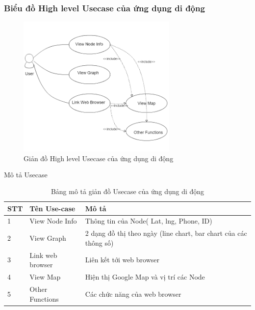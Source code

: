 \subsubsection*{Biểu đồ High level Usecase của ứng dụng di động}

\begin{figure}[H]
\centering    
\includegraphics[width=0.7\textwidth]{app_usecase}
\caption[Giản đồ High level Usecase của ứng dụng di động]{Giản đồ High level Usecase của ứng dụng di động}
\label{fig:app_usecase}
\end{figure}

Mô tả Usecase

\begin{table}[H]
\centering
\caption{Bảng mô tả giản đồ Usecase của ứng dụng di động}
\label{table:usecase_mobile}
\begin{tabular}{|l|l|l|}
\hline
STT & Tên Use-case     & Mô tả                                                            \\ \hline
1   & View Node Info   & Thông tin của Node( Lat, lng, Phone, ID)                         \\ \hline
2   & View Graph       & 2 dạng đồ thị theo ngày (line chart, bar chart của các thông số) \\ \hline
3   & Link web browser & Liên kết tới web browser                                         \\ \hline
4   & View Map         & Hiện thị Google Map và vị trí các Node                           \\ \hline
5   & Other Functions  & Các chức năng của web browser                                    \\ \hline
\end{tabular}
\end{table}













